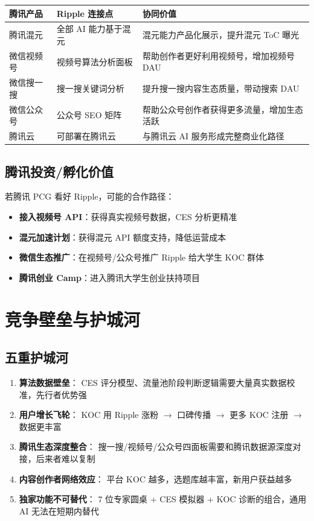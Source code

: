 \documentclass[12pt,a4paper]{ctexart}
\begin{document}
\begin{center}
{\small
\begin{tabular}{p{3cm} p{4.5cm} p{6cm}}
\toprule
\textbf{腾讯产品} & \textbf{Ripple 连接点} & \textbf{协同价值} \\
\midrule
腾讯混元 & 全部 AI 能力基于混元 & 混元能力产品化展示，提升混元 ToC 曝光 \\[3pt]
微信视频号 & 视频号算法分析面板 & 帮助创作者更好利用视频号，增加视频号 DAU \\[3pt]
微信搜一搜 & 搜一搜关键词分析 & 提升搜一搜内容生态质量，带动搜索 DAU \\[3pt]
微信公众号 & 公众号 SEO 矩阵 & 帮助公众号创作者获得更多流量，增加生态活跃 \\[3pt]
腾讯云 & 可部署在腾讯云 & 与腾讯云 AI 服务形成完整商业化路径 \\
\bottomrule
\end{tabular}
}
\end{center}

\subsection{腾讯投资/孵化价值}

若腾讯 PCG 看好 Ripple，可能的合作路径：

\begin{itemize}
  \item \textbf{接入视频号 API}：获得真实视频号数据，CES 分析更精准
  \item \textbf{混元加速计划}：获得混元 API 额度支持，降低运营成本
  \item \textbf{微信生态推广}：在视频号/公众号推广 Ripple 给大学生 KOC 群体
  \item \textbf{腾讯创业 Camp}：进入腾讯大学生创业扶持项目
\end{itemize}


\section{竞争壁垒与护城河}

\subsection{五重护城河}

\begin{enumerate}
  \item \textbf{算法数据壁垒}：
        CES 评分模型、流量池阶段判断逻辑需要大量真实数据校准，先行者优势强
  \item \textbf{用户增长飞轮}：
        KOC 用 Ripple 涨粉 $\rightarrow$ 口碑传播 $\rightarrow$ 更多 KOC 注册 $\rightarrow$ 数据更丰富
  \item \textbf{腾讯生态深度整合}：
        搜一搜/视频号/公众号四面板需要和腾讯数据源深度对接，后来者难以复制
  \item \textbf{内容创作者网络效应}：
        平台 KOC 越多，选题库越丰富，新用户获益越多
  \item \textbf{独家功能不可替代}：
        7 位专家圆桌 + CES 模拟器 + KOC 诊断的组合，通用 AI 无法在短期内替代
\end{enumerate}
\end{document}
